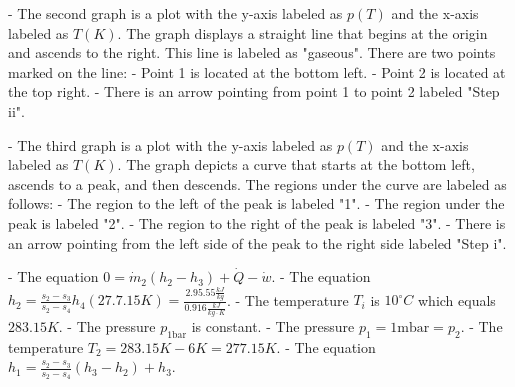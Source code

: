 - The second graph is a plot with the y-axis labeled as \( p(T) \) and the x-axis labeled as \( T(K) \). The graph displays a straight line that begins at the origin and ascends to the right. This line is labeled as "gaseous". There are two points marked on the line:
    - Point 1 is located at the bottom left.
    - Point 2 is located at the top right.
  - There is an arrow pointing from point 1 to point 2 labeled "Step ii".

- The third graph is a plot with the y-axis labeled as \( p(T) \) and the x-axis labeled as \( T(K) \). The graph depicts a curve that starts at the bottom left, ascends to a peak, and then descends. The regions under the curve are labeled as follows:
    - The region to the left of the peak is labeled "1".
    - The region under the peak is labeled "2".
    - The region to the right of the peak is labeled "3".
  - There is an arrow pointing from the left side of the peak to the right side labeled "Step i".

- The equation \( 0 = \dot{m}_2 (h_2 - h_3) + \dot{Q} - \dot{w} \).
- The equation \( h_2 = \frac{s_2 - s_3}{s_2 - s_4} h_4 (27.7.15 K) = \frac{2.95.55 \frac{kJ}{kg}}{0.916 \frac{kJ}{kg \cdot K}} \).
- The temperature \( T_i \) is \( 10^\circ C \) which equals \( 283.15 K \).
- The pressure \( p_{\text{1bar}} \) is constant.
- The pressure \( p_1 = 1 \text{mbar} = p_2 \).
- The temperature \( T_2 = 283.15 K - 6 K = 277.15 K \).
- The equation \( h_1 = \frac{s_2 - s_3}{s_2 - s_4} (h_3 - h_2) + h_3 \).